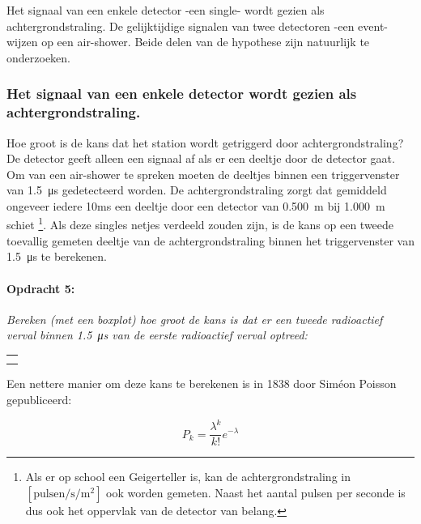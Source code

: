 Het signaal van een enkele detector -een single- wordt gezien als
achtergrondstraling. De gelijktijdige signalen van twee detectoren
-een event- wijzen op een air-shower. Beide delen van de hypothese
zijn natuurlijk te onderzoeken.


\subsubsection{Het signaal van een enkele detector wordt gezien als achtergrondstraling.}

Hoe groot is de kans dat het station wordt getriggerd door achtergrondstraling?
De detector geeft alleen een signaal af als er een deeltje door de
detector gaat. Om van een air-shower te spreken moeten de deeltjes
binnen een triggervenster van \SI{1.5}{\micro\second} gedetecteerd
worden. De achtergrondstraling zorgt dat gemiddeld ongeveer iedere
10ms een deeltje door een detector van \SI{0.500}{\meter} bij \SI{1.000}{\meter}
schiet%
\footnote{Als er op school een Geigerteller is, kan de achtergrondstraling in
$\mathrm{\left[pulsen/s/m^{2}\right]}$ ook worden gemeten. Naast
het aantal pulsen per seconde is dus ook het oppervlak van de detector
van belang.%
}. Als deze singles netjes verdeeld zouden zijn, is de kans op een
tweede toevallig gemeten deeltje van de achtergrondstraling binnen
het triggervenster van \SI{1.5}{\micro\second} te berekenen.

\begin{minipage}[t]{1\columnwidth}%

\paragraph{Opdracht 5:}

\textit{Bereken (met een boxplot) hoe groot de kans is dat er een
tweede radioactief verval binnen \SI{1.5}{\micro\second} van de eerste
radioactief verval optreed:}

\begin{tabular}{>{\raggedright}p{16.6cm}}
    \tabularnewline
    \hline 
    \tabularnewline
    \hline 
    \tabularnewline
    \hline 
    \tabularnewline
    \hline 
\end{tabular}%
\end{minipage}

\bigskip{}


Een nettere manier om deze kans te berekenen is in 1838 door Siméon
Poisson \cite{wiki} gepubliceerd:

\begin{equation}
P_{k}=\frac{\lambda^{k}}{k!}e^{-\lambda}
\end{equation}

